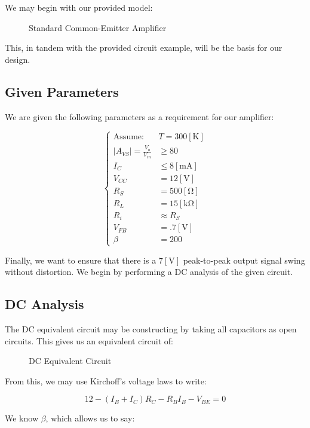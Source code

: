 \documentclass[
	letterpaper, %
	10pt, %
]{CSUniSchoolLabReport}
\begin{document}
We may begin with our provided model:

\begin{figure}[H]
  \centering
  
  \caption{Standard Common-Emitter Amplifier}
  \label{fig:1}
\end{figure}

This, in tandem with the provided circuit example, will be the basis for our design.

\subsection{Given Parameters}

We are given the following parameters as a requirement for our amplifier:

$$\boxed{\left\{\begin{array}{ll}\text{Assume: }&T=300[\si{\kelvin}]\\|A_{VS}|=\frac{V_o}{V_{in}}&\geq 80\\I_C&\leq 8[\si{\milli\ampere}]\\V_{CC}&= 12[\si{\volt}]\\R_S&= 500[\si{\ohm}]\\R_L&= 15[\si{\kilo\ohm}]\\R_i&\approx R_S\\V_{FB}&=.7[\si{\volt}]\\\beta&=200\end{array}}$$

  Finally, we want to ensure that there is a $7[\si{\volt}]$ peak-to-peak output signal swing without distortion. We begin by performing a DC analysis of the given circuit.

\subsection{DC Analysis}

The DC equivalent circuit may be constructing by taking all capacitors as open circuits. This gives us an equivalent circuit of:

\begin{figure}[H]
  \centering
  
  \caption{DC Equivalent Circuit}
  \label{fig:2}
\end{figure}

From this, we may use Kirchoff's voltage laws to write:

$$\boxed{12-(I_B+I_C)R_C-R_BI_B-V_{BE}=0}$$

We know $\beta$, which allows us to say:
\end{document}

